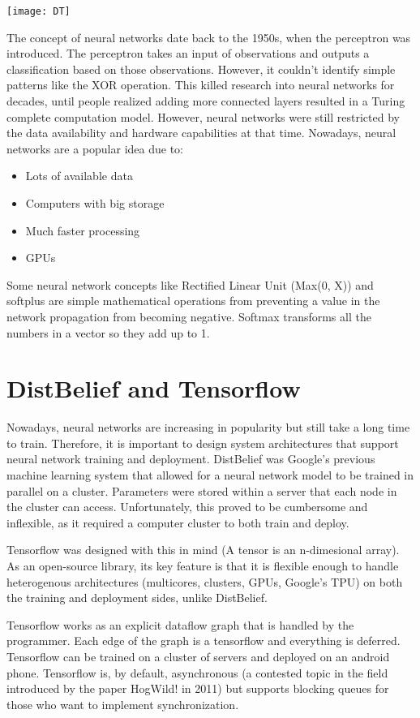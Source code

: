 \documentclass[twoside]{article}
\begin{document}
\begin{center}
    \texttt{[image: DT]}
\end{center}

The concept of neural networks date back to the 1950s, when the perceptron was introduced. The perceptron takes an input of observations and outputs a classification based on those observations. However, it couldn't identify simple patterns like the XOR operation. This killed research into neural networks for decades, until people realized adding more connected layers resulted in a Turing complete computation model. However, neural networks were still restricted by the data availability and hardware capabilities at that time. Nowadays, neural networks are a popular idea due to:

\begin{itemize}
    \item Lots of available data
    \item Computers with big storage
    \item Much faster processing
    \item GPUs
\end{itemize}

Some neural network concepts like Rectified Linear Unit (Max(0, X)) and softplus are simple mathematical operations from preventing a value in the network propagation from becoming negative. Softmax transforms all the numbers in a vector so they add up to 1.

\section{DistBelief and Tensorflow}

Nowadays, neural networks are increasing in popularity but still take a long time to train. Therefore, it is important to design system architectures that support neural network training and deployment. DistBelief was Google's previous machine learning system that allowed for a neural network model to be trained in parallel on a cluster. Parameters were stored within a server that each node in the cluster can access. Unfortunately, this proved to be cumbersome and inflexible, as it required a computer cluster to both train and deploy.

Tensorflow was designed with this in mind (A tensor is an n-dimesional array). As an open-source library, its key feature is that it is flexible enough to handle heterogenous architectures (multicores, clusters, GPUs, Google's TPU) on both the training and deployment sides, unlike DistBelief.

Tensorflow works as an explicit dataflow graph that is handled by the programmer. Each edge of the graph is a tensorflow and everything is deferred. Tensorflow can be trained on a cluster of servers and deployed on an android phone. Tensorflow is, by default, asynchronous (a contested topic in the field introduced by the paper HogWild! in 2011) but supports blocking queues for those who want to implement synchronization. 
\end{document}
